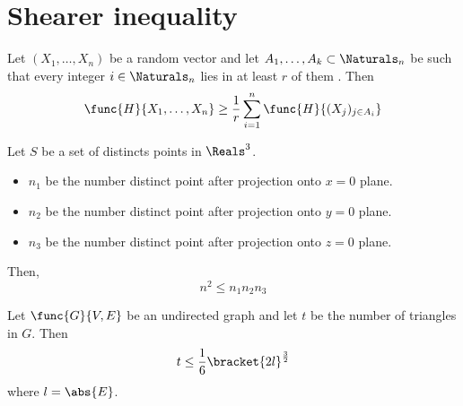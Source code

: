\section{Shearer inequality}
Let \((X_1, \dots , X_n)\) be a random vector and let \(A_1 , \dots , A_k \subset \Naturals_n\) be such that every integer \(i \in \Naturals_n\) lies in at least \(r\) of them . Then 
\begin{equation*}
      \func{H}{X_1, \dots , X_n} \geq \dfrac{1}{r} \sum_{i = 1}^n \func{H}{(X_j)_{j \in A_i}}
\end{equation*}

\begin{example}
      Let \(S\) be a set of distincts points in \(\Reals^3\). 
      \begin{itemize}
            \item \(n_1\) be the number distinct point after projection onto \(x = 0\) plane.
            \item \(n_2\) be the number distinct point after projection onto \(y = 0\) plane.
            \item \(n_3\) be the number distinct point after projection onto \(z = 0\) plane.
      \end{itemize}
      Then, 
      \begin{equation*}
            n^2 \leq n_1 n_2 n_3
      \end{equation*}
\end{example}

\begin{example}
      Let \(\func{G}{V,E}\) be an undirected graph and let \(t\) be the number of triangles in \(G\). Then 
      \begin{equation*}
            t \leq \dfrac{1}{6} \bracket{2l}^{\frac{3}{2}}
      \end{equation*}
      where \(l = \abs{E}\).
\end{example}
